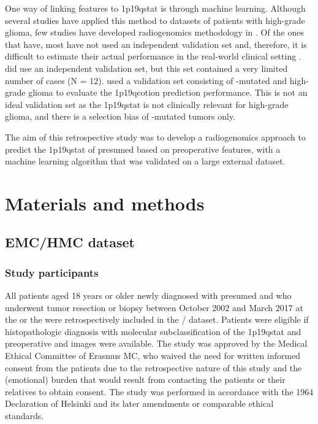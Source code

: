One way of linking  features to \acl{1p19qstat} is through machine learning.
Although several studies have applied this method to datasets of patients with high-grade glioma, few studies have developed radiogenomics methodology in  \autocite{akkus2017predicting, li2017deep, chang2018deep, han2018non, lu2018machine, zhou2019machine}.
Of the ones that have, most have not used an independent validation set and, therefore, it is difficult to estimate their actual performance in the real-world clinical setting \autocite{akkus2017predicting, li2017deep, chang2018deep, han2018non}.
 did use an independent validation set, but this set contained a very limited number of  cases (N = 12).
 used a validation set consisting of -mutated  and high-grade glioma to evaluate the \acl{1p19qcotion} prediction performance.
This is not an ideal validation set as the \acl{1p19qstat} is not clinically relevant for high-grade glioma, and there is a selection bias of -mutated \glspl{tumor} only.

The aim of this retrospective study was to develop a radiogenomics approach to predict the \acl{1p19qstat} of presumed  based on preoperative  features, with a machine learning algorithm that was validated on a large external dataset.

\section{Materials and methods}
\subsection{\acrshort{EMC}/\acrshort{HMC} dataset}
\subsubsection{Study participants}

All patients aged 18 years or older newly diagnosed with presumed  and who underwent \gls{tumor} resection or biopsy between October 2002 and March 2017 at the  or the  were retrospectively included in the / dataset.
Patients were eligible if histopathologic diagnosis with molecular subclassification of the \acl{1p19qstat} and preoperative  and   images were available.
The study was approved by the Medical Ethical Committee of Erasmus MC, who waived the need for written informed consent from the patients due to the retrospective nature of this study and the (emotional) burden that would result from contacting the patients or their relatives to obtain consent.
The study was performed in accordance with the 1964 Declaration of Helsinki and its later amendments or comparable ethical standards.


